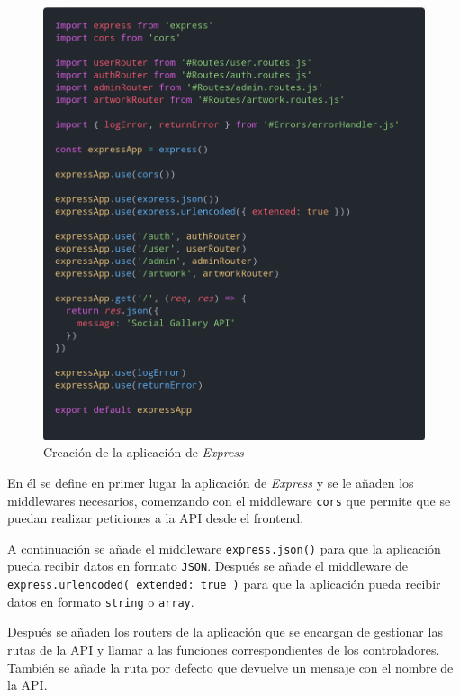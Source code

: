 \begin{figure}[H]
  \centering
  \includegraphics[width=\textwidth]{img/express-app}
  \caption{Creación de la aplicación de \textit{Express}}
  \label{fig:express-app}
\end{figure}

En él se define en primer lugar la aplicación de \textit{Express} y se le añaden los
middlewares necesarios, comenzando con el middleware \texttt{cors} \cite{express-cors}
que permite que se puedan realizar peticiones a la API desde el frontend.

A continuación se añade el middleware \texttt{express.json()} \cite{express-json}
para que la aplicación pueda recibir datos en formato \texttt{JSON}.
Después se añade el middleware de \texttt{express.urlencoded({ extended: true })}
\cite{express-urlencoded} para que la aplicación pueda recibir datos en formato
\texttt{string} o \texttt{array}.

Después se añaden los routers de la aplicación \cite{express-router} que se encargan
de gestionar las rutas de la API y llamar a las funciones correspondientes de los
controladores. También se añade la ruta por defecto que devuelve un mensaje con el
nombre de la API.

